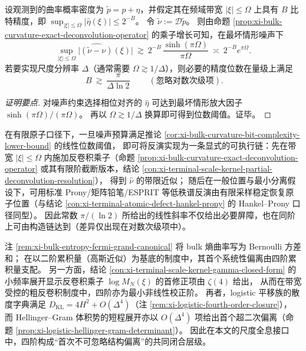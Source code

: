 \begin{corollary}\label{cor:xi-bulk-curvature-bit-complexity-lower-bound}
设观测到的曲率概率密度为 \(\widetilde p=p+\eta\)，并假定其在频域带宽 \(|\xi|\le \Omega\) 上具有 \(B\) 比特精度，即
\(
\sup_{|\xi|\le\Omega}|\widehat\eta(\xi)|\le 2^{-B}
\)。
令 \(\widetilde\nu:=\mathcal D\widetilde p\)。
则由命题 \ref{prop:xi-bulk-curvature-exact-deconvolution-operator} 的乘子增长可知，在最坏情形噪声下
\[
\sup_{|\xi|\le\Omega}\bigl|\widehat{(\widetilde\nu-\nu)}(\xi)\bigr|
\ \gtrsim\
2^{-B}\,\frac{\sinh(\pi\Omega)}{\pi\Omega}
\ \asymp\
2^{-B}e^{\pi\Omega}.
\]
若要实现尺度分辨率 \(\Delta\)（通常需要 \(\Omega\gtrsim 1/\Delta\)），则必要的精度位数在量级上满足
\[
\boxed{\;B\ \gtrsim\ \frac{\pi}{\Delta\ln 2}\;}
\qquad(\text{忽略对数次级项}).
\]
\end{corollary}
\begin{proof}[证明要点]
对噪声约束选择相位对齐的 \(\widehat\eta\) 可达到最坏情形放大因子 \(\sinh(\pi\Omega)/(\pi\Omega)\)。
再以 \(\Omega\gtrsim 1/\Delta\) 换算即可得到位数阈值。证毕。
\end{proof}

\begin{remark}\label{rem:xi-bulk-curvature-superresolution-achievability}
在有限原子口径下，一旦噪声预算满足推论 \ref{cor:xi-bulk-curvature-bit-complexity-lower-bound} 的线性位数阈值，
即可将反演实现为一条显式的可执行链：先在带宽 \(|\xi|\le \Omega\) 内施加反卷积乘子（命题 \ref{prop:xi-bulk-curvature-exact-deconvolution-operator} 或其有限阶截断版本，结论 \ref{con:xi-terminal-scale-kernel-partial-deconvolution-resolution}），
得到 \(\widehat\nu\) 的带限近似；
随后在一般位置与最小分离假设下，可用标准 Prony/矩阵铅笔/ESPRIT 等低秩谱反演由有限采样稳定恢复原子位置（与结论 \ref{con:xi-terminal-atomic-defect-hankel-prony} 的 Hankel--Prony 口径同型）。
因此常数 \(\pi/(\ln 2)\) 所给出的线性斜率不仅给出必要屏障，也在同阶上可由构造链达到（差异仅出现在对数次级项中）。
\end{remark}

\begin{remark}[\texorpdfstring{$(q=4)$}{(q=4)} 的统一阈值：涨落、反卷积与二体体积的首个可见校正阶]\label{rem:xi-scale-q4-threshold-principle}
注 \ref{rem:xi-bulk-entropy-fermi-grand-canonical} 将 bulk 熵曲率写为 Bernoulli 方差和；
在以二阶累积量（高斯近似）为基底的制度中，其首个系统性偏离由四阶累积量支配。
另一方面，结论 \ref{con:xi-terminal-scale-kernel-gamma-closed-form} 的小频率展开显示反卷积乘子 \(\log M_N(\xi)\) 的首修正项由 \(\zeta(4)\) 给出，
从而在带宽受控的粗反卷积制度中，四阶亦为最小非线性校正阶。
再者，logistic 平移族的散度字典满足 \(D_{\mathrm{KL}}=4H^2+O(\Delta^4)\)（注 \ref{rem:xi-logistic-fourth-order-closure}），
而 Hellinger--Gram 体积势的短程展开亦以 \(O(\Delta^4)\) 项给出首个超二次偏离（命题 \ref{prop:xi-logistic-hellinger-gram-determinant}）。
因此在本文的尺度全息接口中，四阶构成“首次不可忽略结构偏离”的共同闭合层级。
\end{remark}

